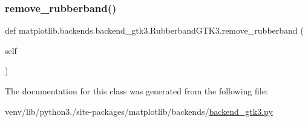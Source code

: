 \subsubsection{\texorpdfstring{remove\+\_\+rubberband()}{remove\_rubberband()}}
{\footnotesize\ttfamily def matplotlib.\+backends.\+backend\+\_\+gtk3.\+Rubberband\+G\+T\+K3.\+remove\+\_\+rubberband (\begin{DoxyParamCaption}\item[{}]{self }\end{DoxyParamCaption})}



The documentation for this class was generated from the following file\+:\begin{DoxyCompactItemize}
\item 
venv/lib/python3./site-\/packages/matplotlib/backends/\hyperlink{backend__gtk3_8py}{backend\+\_\+gtk3.\+py}\end{DoxyCompactItemize}
